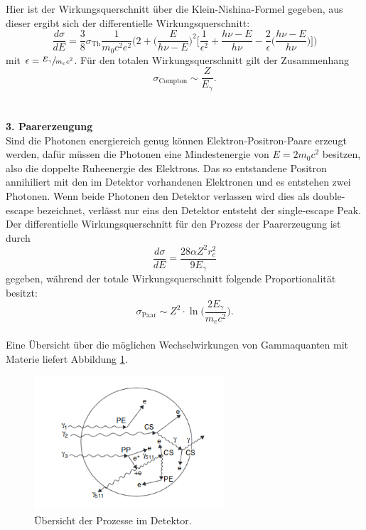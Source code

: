 Hier ist der Wirkungsquerschnitt über die Klein-Nishina-Formel gegeben, aus dieser ergibt sich der
differentielle Wirkungsquerschnitt:
\begin{equation}
  \frac{d\sigma}{dE}=\frac{3}{8}\sigma_{\text{Th}}\frac{1}{m_0 c^2 e^2}\bigg(2+\bigg(\frac{E}{h\nu-E} \bigg)^2 \bigg[\frac{1}{\epsilon^2}+
  \frac{h\nu-E}{h\nu}-\frac{2}{\epsilon}\bigg(\frac{h\nu-E}{h\nu}\bigg) \bigg]\bigg)
  \label{eqn:diffCompton}
\end{equation}
mit $\epsilon=\sfrac{E_{\gamma}}{m_e c^2}$.
Für den totalen Wirkungsquerschnitt gilt der Zusammenhang
\begin{equation}
  \sigma_{\text{Compton}}\sim \frac{Z}{E_{\gamma}}.
  \label{eqn:WPCompton}
\end{equation}
\\
\\
\textbf{3. Paarerzeugung}\\
Sind die Photonen energiereich genug können Elektron-Positron-Paare erzeugt werden, dafür müssen
die Photonen eine Mindestenergie von $E=2 m_0 c^2$ besitzen, also die doppelte
Ruheenergie des Elektrons.
Das so entstandene Positron annihiliert mit den im Detektor vorhandenen Elektronen und es
entstehen zwei Photonen. Wenn beide Photonen den Detektor verlassen wird dies als double-escape
bezeichnet, verlässt nur eins den Detektor entsteht der single-escape Peak.
Der differentielle Wirkungsquerschnitt für den Prozess der Paarerzeugung ist durch
\begin{equation}
  \frac{d\sigma}{dE}= \frac{28\alpha Z^2 r_{e}^2}{9E_{\gamma}}
  \label{eqn:diffPaar}
\end{equation}
gegeben, während der totale Wirkungsquerschnitt folgende Proportionalität besitzt:
\begin{equation}
  \sigma_{\text{Paar}}\sim Z^2\cdot\ln\Bigg(\frac{2E_{\gamma}}{m_e c^2}\Bigg).
  \label{eqn:WQPaar}
\end{equation}
\\

Eine Übersicht über die möglichen Wechselwirkungen von Gammaquanten mit Materie liefert
Abbildung \ref{fig:Effekt}.
\begin{figure}[H]
  \centering
  \includegraphics[height=5cm]{Effekte.png}
  \caption{Übersicht der Prozesse im Detektor. \cite{Gilmore2}}
  \label{fig:Effekt}
\end{figure}


